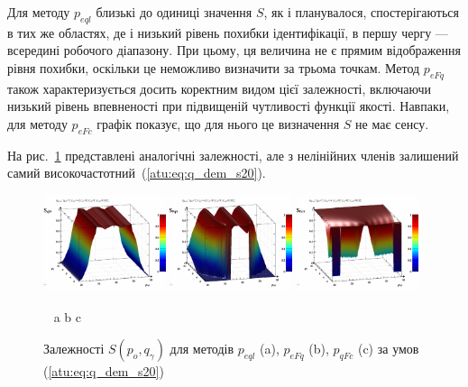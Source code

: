 Для методу $p_{eql}$ близькі до одиниці значення $S$, як і планувалося,
спостерігаються в тих же областях, де і низький рівень похибки ідентифікації, в
першу чергу --- всередині робочого діапазону. При цьому, ця величина не є
прямим відображення рівня похибки, оскільки це неможливо визначити за трьома точкам.
Метод $p_{eFq}$ також характеризується досить коректним видом цієї залежності,
включаючи низький рівень впевненості при підвищеній чутливості функції якості.
Навпаки, для методу $p_{eFc}$ графік показує, що для нього це визначення $S$ не має сенсу.


На рис.~\ref{atu:f:qsl_S_po_qg_s20} представлені аналогічні залежності,
але з нелінійних членів залишений самий високочастотний~(\ref{atu:eq:q_dem_s20}).

\begin{figure}[htb!]
  \begin{center}
    \includegraphics[width=0.32\textwidth]{p/qls_pe-p_po_qg_Sql_s20.png}
    \hfill
    \includegraphics[width=0.32\textwidth]{p/qls_pe-p_po_qg_SFq_s20.png}
    \hfill
    \includegraphics[width=0.32\textwidth]{p/qls_pe-p_po_qg_SFc_s20.png}
  \end{center}
  \vspace{-1.0ex}
  \begin{center}
    ~ \hfill a \hfill\hfill b \hfill\hfill c \hfill ~
  \end{center}
  \vspace{-1.5ex}
  \caption{Залежності $S(p_o,q_\gamma)$ для методів $p_{eql}$ (a), $p_{eFq}$ (b), $p_{qFc}$ (c) за умов (\ref{atu:eq:q_dem_s20})}
  \label{atu:f:qsl_S_po_qg_s20}
\end{figure}

